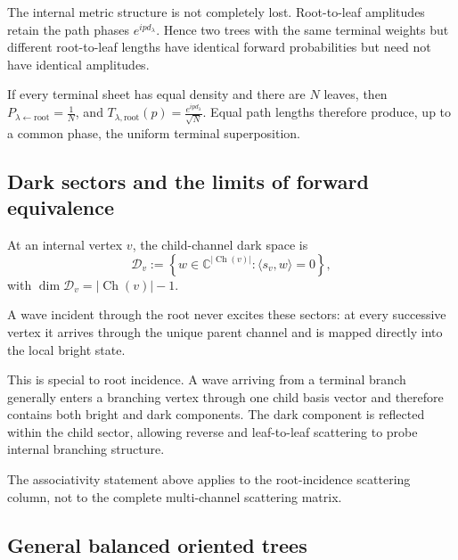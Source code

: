 \documentclass[11pt]{article}
\theoremstyle{plain}
\theoremstyle{definition}
\begin{document}
The internal metric structure is not completely lost. Root-to-leaf
amplitudes retain the path phases
\(e^{ipd_\lambda}\).
Hence two trees with the same terminal weights but different
root-to-leaf lengths have identical forward probabilities but need not have
identical amplitudes.

If every terminal sheet has equal density and there are \(N\) leaves, then
\(P_{\lambda\leftarrow\mathrm{root}} = \frac1N\),
and
\(T_{\lambda,\mathrm{root}}(p) = \frac{e^{ipd_\lambda}}{\sqrt N}\).
Equal path lengths therefore produce, up to a common phase, the uniform
terminal superposition.

\subsection{Dark sectors and the limits of forward equivalence}
\label{subsec:trees-dark-modes}

At an internal vertex \(v\), the child-channel dark space is
\[
  \mathcal D_v
  :=
  \left\{
    w\in
    \mathbb C^{|\operatorname{Ch}(v)|}:
    \langle s_v,w\rangle=0
  \right\},
\]
with
\(\dim\mathcal D_v = |\operatorname{Ch}(v)|-1\).

A wave incident through the root never excites these sectors: at every
successive vertex it arrives through the unique parent channel and is
mapped directly into the local bright state.

This is special to root incidence. A wave arriving from a terminal branch
generally enters a branching vertex through one child basis vector and
therefore contains both bright and dark components. The dark component is
reflected within the child sector, allowing reverse and leaf-to-leaf
scattering to probe internal branching structure.

The associativity statement above applies to the
root-incidence scattering column, not to the complete multi-channel
scattering matrix.

\subsection{General balanced oriented trees}
\label{subsec:trees-general-oriented}
\label{subsec:trees-global-first-order}
\end{document}
